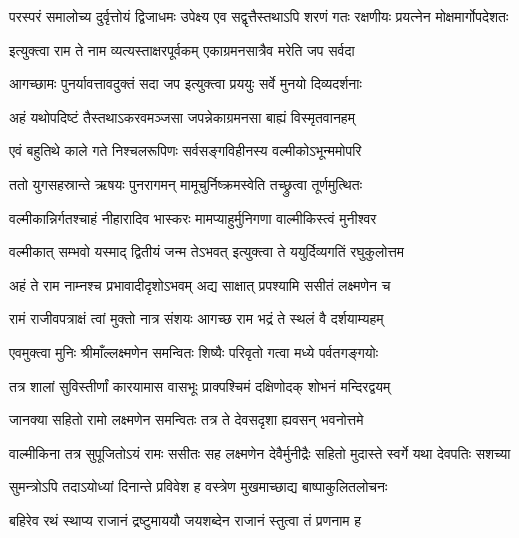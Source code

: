 \threelineshloka
{परस्परं समालोच्य दुर्वृत्तोयं द्विजाधमः}
{उपेक्ष्य एव सद्वृत्तैस्तथाऽपि शरणं गतः}
{रक्षणीयः प्रयत्नेन मोक्षमार्गोपदेशतः} %

\twolineshloka
{इत्युक्त्वा राम ते नाम व्यत्यस्ताक्षरपूर्वकम्}
{एकाग्रमनसात्रैव मरेति जप सर्वदा} %

\twolineshloka
{आगच्छामः पुनर्यावत्तावदुक्तं सदा जप}
{इत्युक्त्वा प्रययुः सर्वे मुनयो दिव्यदर्शनाः} %

\twolineshloka
{अहं यथोपदिष्टं तैस्तथाऽकरवमञ्जसा}
{जपन्नेकाग्रमनसा बाह्यं विस्मृतवानहम्} %

\twolineshloka
{एवं बहुतिथे काले गते निश्चलरूपिणः}
{सर्वसङ्गविहीनस्य वल्मीकोऽभून्ममोपरि} %

\twolineshloka
{ततो युगसहस्रान्ते ऋषयः पुनरागमन्}
{मामूचुर्निष्क्रमस्वेति तच्छ्रुत्वा तूर्णमुत्थितः} %

\twolineshloka
{वल्मीकान्निर्गतश्चाहं नीहारादिव भास्करः}
{मामप्याहुर्मुनिगणा वाल्मीकिस्त्वं मुनीश्वर} %

\twolineshloka
{वल्मीकात् सम्भवो यस्माद् द्वितीयं जन्म तेऽभवत्}
{इत्युक्त्वा ते ययुर्दिव्यगतिं रघुकुलोत्तम} %

\twolineshloka
{अहं ते राम नाम्नश्च प्रभावादीदृशोऽभवम्}
{अद्य साक्षात् प्रपश्यामि ससीतं लक्ष्मणेन च} %

\twolineshloka
{रामं राजीवपत्राक्षं त्वां मुक्तो नात्र संशयः}
{आगच्छ राम भद्रं ते स्थलं वै दर्शयाम्यहम्} %

\twolineshloka
{एवमुक्त्वा मुनिः श्रीमाँल्लक्ष्मणेन समन्वितः}
{शिष्यैः परिवृतो गत्वा मध्ये पर्वतगङ्गयोः} %

\twolineshloka
{तत्र शालां सुविस्तीर्णां कारयामास वासभूः}
{प्राक्पश्चिमं दक्षिणोदक् शोभनं मन्दिरद्वयम्} %

\twolineshloka
{जानक्या सहितो रामो लक्ष्मणेन समन्वितः}
{तत्र ते देवसदृशा ह्यवसन् भवनोत्तमे} %

\fourlineindentedshloka
{वाल्मीकिना तत्र सुपूजितोऽयं}
{रामः ससीतः सह लक्ष्मणेन}
{देवैर्मुनीद्रैः सहितो मुदास्ते}
{स्वर्गे यथा देवपतिः सशच्या} %





\twolineshloka
{सुमन्त्रोऽपि तदाऽयोध्यां दिनान्ते प्रविवेश ह}
{वस्त्रेण मुखमाच्छाद्य बाष्पाकुलितलोचनः} %

\twolineshloka
{बहिरेव रथं स्थाप्य राजानं द्रष्टुमाययौ}
{जयशब्देन राजानं स्तुत्वा तं प्रणनाम ह} %

